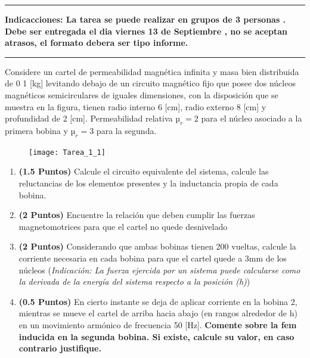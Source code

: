 \documentclass[
  11pt,
  letterpaper,
   addpoints,
   answers
  ]{exam}
\begin{document}
\vspace{0.5cm}
\noindent
\vspace{.85cm}
\hrule
\textbf{Indicacciones: La tarea se puede realizar en grupos de 3 personas . Debe ser entregada el dia viernes 13 de Septiembre , no se aceptan atrasos, el formato debera ser tipo informe.}
\hrule
\noindent
\vspace{.85cm}
\begin{questions}
    \question Considere un cartel de permeabilidad magnética infinita y masa bien distribuida de 0 1 [kg] levitando debajo de un circuito magnético fijo que posee dos núcleos magnéticos semicirculares de iguales dimensiones, con la disposición que se muestra en la figura, tienen radio interno 6 [cm], radio externo 8 [cm] y profundidad de 2 [cm]. Permeabilidad relativa $µ_{r} =2$ para el núcleo asociado a la primera bobina y $µ_{r}=3$ para la segunda.
    \begin{figure}[h!]
        \centering
        \texttt{[image: Tarea\_1\_1]}
    \end{figure}
    \begin{enumerate}[label=\alph*)]
        \item \textbf{(1.5 Puntos)} Calcule el circuito equivalente del sistema, calcule las reluctancias de los elementos presentes y la inductancia propia de cada bobina.
        \item \textbf{(2 Puntos)} Encuentre la relación que deben cumplir las fuerzas magnetomotrices para que el cartel no quede desnivelado
        \item \textbf{(2 Puntos)} Considerando que ambas bobinas tienen 200 vueltas, calcule la corriente necesaria en cada bobina para que el cartel quede a 3mm de los núcleos (\textit{Indicación: La fuerza ejercida por un sistema puede calcularse como la derivada de la energía del sistema respecto a la posición (h)})
        \item \textbf{(0.5 Puntos)} En cierto instante se deja de aplicar corriente en la bobina 2, mientras se mueve el cartel de arriba hacia abajo (en rangos alrededor de h) en un movimiento armónico de frecuencia 50 [Hz]. \textbf{Comente sobre la fem inducida en la segunda bobina. Si existe, calcule su valor, en caso contrario justifique.}
    \end{enumerate}
    


\end{questions}
\end{document}
